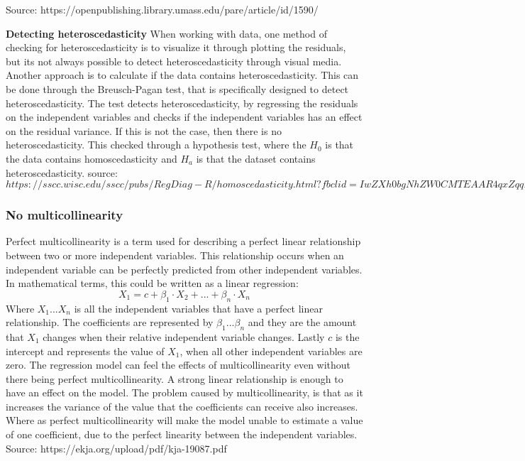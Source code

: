 Source: https://openpublishing.library.umass.edu/pare/article/id/1590/

\textbf{Detecting heteroscedasticity}
When working with data, one method of checking for heteroscedasticity is to visualize it through plotting the residuals, but its not always possible to detect heteroscedasticity through visual media. Another approach is to calculate if the data contains heteroscedasticity. This can be done through the Breusch-Pagan test, that is specifically designed to detect heteroscedasticity. The test detects heteroscedasticity, by regressing the residuals on the independent variables and checks if the independent variables has an effect on the residual variance. If this is not the case, then there is no heteroscedasticity. This checked through a hypothesis test, where the $H_0$ is that the data contains homoscedasticity and $H_a$ is that the dataset contains heteroscedasticity.
source: $https://sscc.wisc.edu/sscc/pubs/RegDiag-R/homoscedasticity.html?fbclid=IwZXh0bgNhZW0CMTEAAR4qxZqqD0CVoqZfHgWZU8lUOuxg43dFRSs9Opswn-IAo8l-UaO1oDWCuUfkvw_aem_9Ft7wkFWKUHycQ1GnX-x0g$

\subsubsection{No multicollinearity}
Perfect multicollinearity is a term used for describing a perfect linear relationship between two or more independent variables. This relationship occurs when an independent variable can be perfectly predicted from other independent variables. In mathematical terms, this could be written as a linear regression:
$$
X_1 = c+\beta_1\cdot X_2+...+\beta_n\cdot X_n
$$ 
Where $X_1...X_n$ is all the independent variables that have a perfect linear relationship. The coefficients are represented by $\beta_1...\beta_n$ and they are the amount that $X_1$ changes when their relative independent variable changes.
Lastly $c$ is the intercept and represents the value of $X_1$, when all other independent variables are zero.
\newline
The regression model can feel the effects of multicollinearity even without there being perfect multicollinearity. A strong linear relationship is enough to have an effect on the model. The problem caused by multicollinearity, is that as it increases the variance of the value that the coefficients can receive also increases. Where as perfect multicollinearity will make the model unable to estimate a value of one coefficient, due to the perfect linearity between the independent variables.
\newline
Source: https://ekja.org/upload/pdf/kja-19087.pdf

